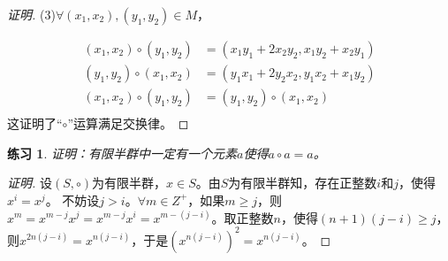 \documentclass{article}
\newtheorem{Exercise}{练习}
\begin{document}
\begin{CJK*}{UTF8}{gbsn}
\begin{proof}[证明]
(3)$\forall (x_1,x_2), (y_1,y_2)\in M$，

\begin{align*}
  (x_1,x_2)\circ (y_1,y_2) &= (x_1y_1+2x_2y_2,x_1y_2+x_2y_1)\\
  (y_1,y_2)\circ (x_1,x_2) &= (y_1x_1+2y_2x_2,y_1x_2+x_1y_2)\\
  (x_1,x_2)\circ (y_1,y_2) &= (y_1,y_2)\circ (x_1,x_2)\\
\end{align*}
这证明了“$\circ$”运算满足交换律。
\end{proof}

\begin{Exercise}
  证明：有限半群中一定有一个元素$a$使得$a\circ a=a$。
\end{Exercise}

\begin{proof}[证明]
  设$(S,\circ)$为有限半群，$x\in S$。由$S$为有限半群知，存在正整数$i$和$j$，使得$x^i=x^j$。
  不妨设$j>i$。$\forall m\in Z^+$，如果$m\geq j$，则$x^m=x^{m-j}x^j=x^{m-j}x^i=x^{m-(j-i)}$。取正整数$n$，使得$(n+1)(j-i)\geq j$，则$x^{2n(j-i)}=x^{n(j-i)}$，于是$(x^{n(j-i)})^2=x^{n(j-i)}$。
\end{proof}



\end{CJK*}
\end{document}
